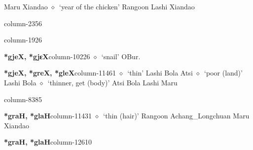 \hspace{1ex}
         Maru 
\hspace{1ex}
         Xiandao 
\hspace{1ex}
         $\diamond$~`year of the chicken'
         Rangoon 
\hspace{1ex}
         Lashi 
\hspace{1ex}
         Xiandao 
  \item {\footnotesize \textbf{}}{\tiny column-2356}
  \item {\footnotesize \textbf{}}{\tiny column-1926}
  \item {\footnotesize \textbf{*gjeX, *gjɛX}}{\tiny column-10226}
         $\diamond$~`snail'
         OBur. 
  \item {\footnotesize \textbf{*gjeX, *greX, *gleX}}{\tiny column-11461}
         $\diamond$~`thin'
         Lashi 
\hspace{1ex}
         Bola 
\hspace{1ex}
         Atsi 
\hspace{1ex}
         $\diamond$~`poor (land)'
         Lashi 
\hspace{1ex}
         Bola 
\hspace{1ex}
         $\diamond$~`thinner, get (body)'
         Atsi 
\hspace{1ex}
         Bola 
\hspace{1ex}
         Lashi 
\hspace{1ex}
         Maru 
  \item {\footnotesize \textbf{}}{\tiny column-8385}
  \item {\footnotesize \textbf{*graH, *glaH}}{\tiny column-11431}
         $\diamond$~`thin (hair)'
         Rangoon 
\hspace{1ex}
         Achang\_Longchuan 
\hspace{1ex}
         Maru 
\hspace{1ex}
         Xiandao 
  \item {\footnotesize \textbf{*graH, *glaH}}{\tiny column-12610}
